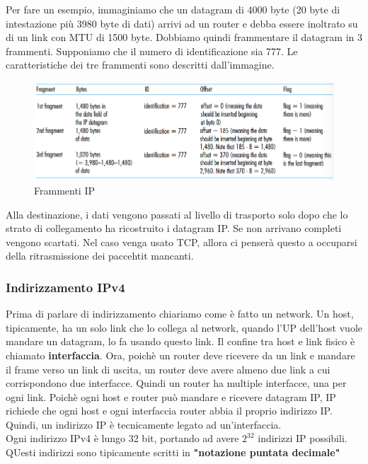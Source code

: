 \documentclass[11pt,a4paper]{article}
\begin{document}
Per fare un esempio, immaginiamo che un datagram di 4000 byte (20 byte di intestazione più 3980 byte di dati) arrivi ad un router e debba essere inoltrato su di un link con MTU di 1500 byte. Dobbiamo quindi frammentare il datagram in 3 frammenti. Supponiamo che il numero di identificazione sia 777. Le caratteristiche dei tre frammenti sono descritti dall'immagine.
\begin{figure}
	\includegraphics[scale=0.6]{img/053.png}
	\caption{Frammenti IP}
\end{figure}
Alla destinazione, i dati vengono passati al livello di trasporto solo dopo che lo strato di collegamento ha ricostruito i datagram IP. Se non arrivano completi vengono scartati. Nel caso venga usato TCP, allora ci penserà questo a occuparsi della ritrasmissione dei paccehtit mancanti.
\subsubsection{Indirizzamento IPv4}
Prima di parlare di indirizzamento chiariamo come è fatto un network. Un host, tipicamente, ha un solo link che lo collega al network, quando l'UP dell'host vuole mandare un datagram, lo fa usando questo link. Il confine tra host e link fisico è chiamato \textbf{interfaccia}. Ora, poichè un router deve ricevere da un link e mandare il frame verso un link di uscita, un router deve avere almeno due link a cui corrispondono due interfacce. Quindi un router ha multiple interfacce, una per ogni link. Poichè ogni host e router può mandare e ricevere datagram IP, IP richiede che ogni host e ogni interfaccia router abbia il proprio indirizzo IP. Quindi, un indirizzo IP è tecnicamente legato ad un'interfaccia. \\
Ogni indirizzo IPv4 è lungo 32 bit, portando ad avere $2^{32}$ indirizzi IP possibili. QUesti indirizzi sono tipicamente scritti in \textbf{"notazione puntata decimale"} 
\end{document}
